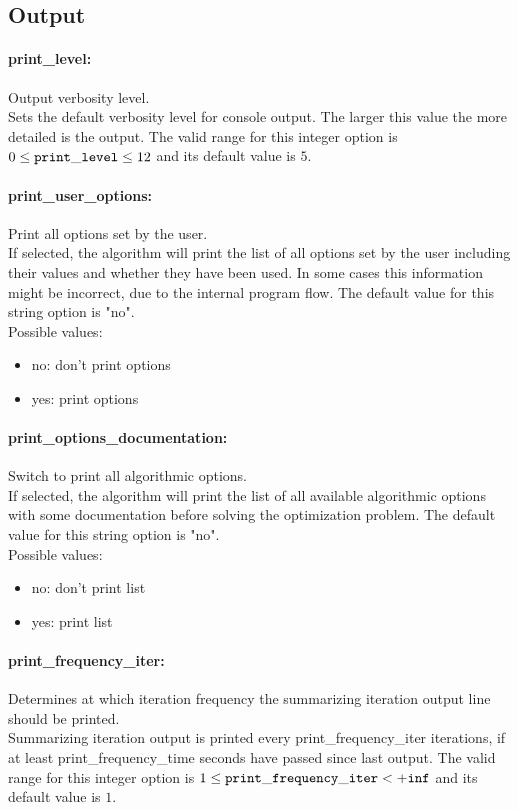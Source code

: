 \subsection{Output}

\paragraph{print\_level:}\label{opt:print_level} Output verbosity level. \\
 Sets the default verbosity level for console output. The larger this value the more detailed is the output. The valid range for this integer option is
$0 \le {\tt print\_level } \le 12$
and its default value is $5$.


\paragraph{print\_user\_options:}\label{opt:print_user_options} Print all options set by the user. \\
 If selected, the algorithm will print the list of all options set by the user including their values and whether they have been used.  In some cases this information might be incorrect, due to the internal program flow. The default value for this string option is "no".
\\ 
Possible values:
\begin{itemize}
   \item no: don't print options
   \item yes: print options
\end{itemize}

\paragraph{print\_options\_documentation:}\label{opt:print_options_documentation} Switch to print all algorithmic options. \\
 If selected, the algorithm will print the list of all available algorithmic options with some documentation before solving the optimization problem. The default value for this string option is "no".
\\ 
Possible values:
\begin{itemize}
   \item no: don't print list
   \item yes: print list
\end{itemize}

\paragraph{print\_frequency\_iter:}\label{opt:print_frequency_iter} Determines at which iteration frequency the summarizing iteration output line should be printed. \\
 Summarizing iteration output is printed every print\_frequency\_iter iterations, if at least print\_frequency\_time seconds have passed since last output. The valid range for this integer option is
$1 \le {\tt print\_frequency\_iter } <  {\tt +inf}$
and its default value is $1$.


